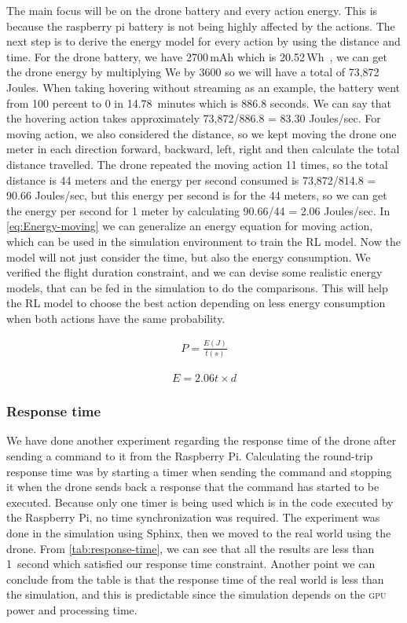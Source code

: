 \documentclass[../main.tex]{subfiles}
\begin{document}
The main focus will be on the drone battery and every 
action energy. This is because the raspberry pi battery 
is not being highly affected by the actions. 
The next step is to derive the energy model for every 
action by using the distance and time. For the drone battery, 
we have 2700\,mAh which is 20.52\,Wh~\cite{Par19}, 
we can get the drone energy by multiplying We by 3600 
so we will have a total of 73,872 Joules. When taking
hovering without streaming as an example, the battery 
went from 100 percent to 0 in \SI{14.78}{minutes} which is 
886.8 seconds. We can say that the hovering action takes 
approximately 73,872/886.8 = 83.30 Joules/sec. 
For moving action,
we also considered the distance, so we kept 
moving the drone one meter in each direction 
{forward, backward, left, right} and then calculate 
the total distance travelled. The drone repeated 
the moving action 11 times, so the total distance 
is 44 meters and the energy per second consumed 
is 73,872/814.8 = 90.66 Joules/sec, but this energy 
per second is for the 44 meters, so we can get the 
energy per second for 1 meter by calculating 
90.66/44 = 2.06 Joules/sec. 
In \cref{eq:Energy-moving} we can generalize an energy 
equation for moving action, which can be used in the simulation 
environment to train the RL model. Now the model will not 
just consider the time, but also the energy consumption.
We verified the flight duration constraint, and we can devise some 
realistic energy models, that can be fed in the simulation 
to do the comparisons. This will help the RL model to choose 
the best action depending on less energy consumption 
when both actions have the same probability. 

\begin{align}
	P = \frac{E(J)}{t(s)} 
	\label{eq:power}
\end{align}

\begin{align}
	E = 2.06t \times d
	\label{eq:Energy-moving}
\end{align}

\subsubsection{Response time}

We have done another experiment regarding the response time 
of the drone after sending a command to it from the Raspberry Pi. 
Calculating the round-trip response time was by starting a timer when
sending the command and stopping it when the drone sends back a
response that the command has started to be executed. 
Because only one timer is being used which is in the code executed by
the Raspberry Pi, no time synchronization was required.
The experiment was done in the simulation using Sphinx,
then we moved to the real world using the \anafi drone.
From \cref{tab:response-time}, 
we can see that all the results are less than \SI{1}{second}
which satisfied our response time constraint.
Another point we can conclude from the table is that 
the response time of the real world is less than 
the simulation, and this is predictable since the simulation
depends on the \textsc{gpu} power and processing time. 
\end{document}
